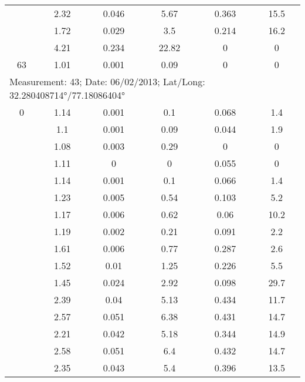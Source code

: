 \begin{longtable}{cccccc}
		& 2.32  & 0.046 & 5.67  & 0.363 & 15.5 \\
		
		& 1.72  & 0.029 & 3.5   & 0.214 & 16.2 \\
		
		& 4.21  & 0.234 & 22.82 & 0     & 0 \\
		
		63    & 1.01  & 0.001 & 0.09  & 0     & 0 \\
		\midrule
		\multicolumn{6}{l}{Measurement: 43; Date: 06/02/2013;
			Lat/Long: 32.280408714°/77.18086404°} \\		
		\midrule
		0     & 1.14  & 0.001 & 0.1   & 0.068 & 1.4 \\
		
		& 1.1   & 0.001 & 0.09  & 0.044 & 1.9 \\
		
		& 1.08  & 0.003 & 0.29  & 0     & 0 \\
		
		& 1.11  & 0     & 0     & 0.055 & 0 \\
		
		& 1.14  & 0.001 & 0.1   & 0.066 & 1.4 \\
		
		& 1.23  & 0.005 & 0.54  & 0.103 & 5.2 \\
		
		& 1.17  & 0.006 & 0.62  & 0.06  & 10.2 \\
		
		& 1.19  & 0.002 & 0.21  & 0.091 & 2.2 \\
		
		& 1.61  & 0.006 & 0.77  & 0.287 & 2.6 \\
		
		& 1.52  & 0.01  & 1.25  & 0.226 & 5.5 \\
		
		& 1.45  & 0.024 & 2.92  & 0.098 & 29.7 \\
		
		& 2.39  & 0.04  & 5.13  & 0.434 & 11.7 \\
		
		& 2.57  & 0.051 & 6.38  & 0.431 & 14.7 \\
		
		& 2.21  & 0.042 & 5.18  & 0.344 & 14.9 \\
		
		& 2.58  & 0.051 & 6.4   & 0.432 & 14.7 \\
		
		& 2.35  & 0.043 & 5.4   & 0.396 & 13.5 \\
		

\end{longtable}
